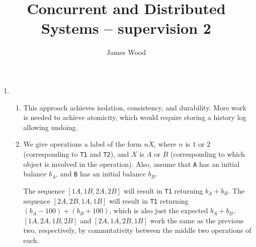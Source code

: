 \documentclass{article}
\begin{document}
\title{Concurrent and Distributed Systems -- supervision 2}
\author{James Wood}
\maketitle

\begin{enumerate}
\item
  \begin{enumerate}
  \item This approach achieves isolation, consistency, and durability. More work is needed to achieve atomicity, which would require storing a history log allowing undoing.
  \item
    We give operations a label of the form $nX$, where $n$ is $1$ or $2$ (corresponding to \texttt{T1} and \texttt{T2}), and $X$ is $A$ or $B$ (corresponding to which object is involved in the operation). Also, assume that \texttt{A} has an initial balance $b_A$, and \texttt{B} has an initial balance $b_B$.

    The sequence $[1A,1B,2A,2B]$ will result in \texttt{T1} returning $b_A+b_B$. The sequence $[2A,2B,1A,1B]$ will result in \texttt{T1} returning $(b_A-100)+(b_B+100)$, which is also just the expected $b_A+b_B$. $[1A,2A,1B,2B]$ and $[2A,1A,2B,1B]$ work the same as the previous two, respectively, by commutativity between the middle two operations of each.


\end{enumerate}
\end{enumerate}
\end{document}
